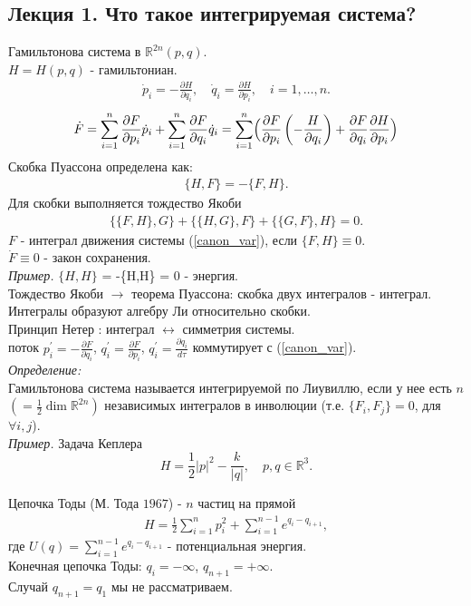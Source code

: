 \documentclass[a4paper,12pt]{article}
\theoremstyle{definition}
\theoremstyle{definition}
\theoremstyle{definition}
\newcommand{\bear}[1]{\begin{eqnarray}\label{#1}}
\newcommand{\ear}{\end{eqnarray}}
\newcommand{\R}{ {\mathbb R} }
\begin{document}
\subsection{Лекция 1. Что такое интегрируемая система?}

Гамильтонова система в $\R^{2n}(p,q)$.\\
$H = H(p,q)$ - гамильтониан.
\bear{canon_var}
\dot{p}_{i} = - \frac{\partial H}{\partial q_{i}}, \quad \dot{q}_{i} = \frac{\partial H}{\partial p_{i}}, \quad i=1,\ldots,n.
\ear
\bear{F}
\dot{F} = \sum^{n}_{i=1} \frac{\partial F}{\partial p_{i}}\dot{p}_{i} + \sum^{n}_{i=1} \frac{\partial F}{\partial q_{i}}\dot{q}_{i} = \sum^{n}_{i=1}\Bigl(\frac{\partial F}{\partial p_{i}}\left( - \frac{H}{\partial q_{i}}\right) + \frac{\partial{F}}{\partial q_{i}}\frac{\partial H}{\partial p_{i}} \Bigr)
\ear
Скобка Пуассона определена как:
\bear{Pois_br}
\{H,F\} = -\{F,H\}.
\ear
Для скобки выполняется тождество Якоби
\bear{Yakobi_eq}
\{\{F,H\},G\} + \{\{H,G\},F\} + \{\{G,F\},H\} =0.
\ear
$F$ - интеграл движения системы (\ref{canon_var}), если $\{F,H\} \equiv 0$.\\
$\dot{F} \equiv 0$ - закон сохранения.\\

\textit{Пример.} $\{H,H\}$ = -\{H,H\} = 0 - энергия.\\

Тождество Якоби $\rightarrow$ теорема Пуассона: скобка двух интегралов - интеграл. Интегралы образуют алгебру Ли относительно скобки.\\

Принцип Нетер : интеграл $\leftrightarrow$  симметрия системы.\\
поток $p^{'}_{i} = -\displaystyle\frac{\partial F}{\partial q_{i}}$, $q^{'}_{i} = \displaystyle\frac{\partial F}{\partial p_{i}}$, $q^{'}_{i} = \displaystyle\frac{\partial q_{i}}{d \tau}$ коммутирует с (\ref{canon_var}).\\


\textit{Определение:}\\
Гамильтонова система называется интегрируемой по Лиувиллю, если у нее есть $n$ $\left( = \frac 12 \dim \R^{2n} \right)$ независимых интегралов в инволюции (т.е. $\{F_{i}, F_{j}\} =0$, для $\forall i,j$).\\


\textit{Пример.} Задача Кеплера
\[H = \frac12 |p|^{2} - \frac{k}{|q|},\quad p,q \in \R^{3}.\]

Цепочка Тоды (М. Тода $1967$) -  $n$ частиц на прямой
\bear{Toda_ham}
H = \frac12 \sum^{n}_{i=1}p^{2}_{i} + \sum^{n-1}_{i=1}e^{q_{i} - q_{i+1}},
\ear
где $U(q) = \displaystyle{\sum^{n-1}_{i=1}e^{q_{i} - q_{i+1}}}$ - потенциальная энергия.\\
Конечная цепочка Тоды: $q_{i} = -\infty$, $q_{n+1} = +\infty$.\\
Случай $q_{n+1} = q_{1}$ мы не рассматриваем.\\
\end{document}
